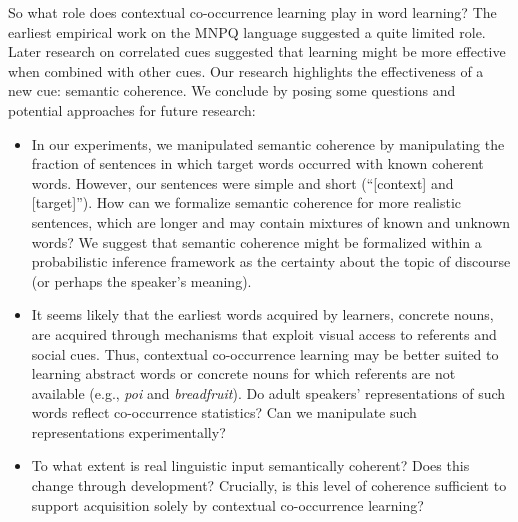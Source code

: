 \documentclass[man,floatsintext]{apa6}
\begin{document}



So what role does contextual co-occurrence learning play in word learning? The earliest empirical work on the MNPQ language suggested a quite limited role. Later research on correlated cues suggested that learning might be more effective when combined with other cues. Our research highlights the effectiveness of a new cue: semantic coherence. We conclude by posing some questions and potential approaches for future research:

\begin{itemize}
\item In our experiments, we manipulated semantic coherence by manipulating the fraction of sentences in which target words occurred with known coherent words. However, our sentences were simple and short (``[context] and [target]''). How can we formalize semantic coherence for more realistic sentences, which are longer and may contain mixtures of known and unknown words? We suggest that semantic coherence might be formalized within a probabilistic inference framework as the certainty about the topic of discourse (or perhaps the speaker's meaning).

\item It seems likely that the earliest words acquired by learners, concrete nouns, are acquired through mechanisms that exploit visual access to referents and social cues. Thus, contextual co-occurrence learning may be better suited to learning abstract words or concrete nouns for which referents are not available (e.g., \emph{poi} and \emph{breadfruit}). Do adult speakers' representations of such words reflect co-occurrence statistics? Can we manipulate such representations experimentally?

\item To what extent is real linguistic input semantically coherent? Does this change through development? Crucially, is this level of coherence sufficient to support acquisition solely by contextual co-occurrence learning?


\end{itemize}

\nocite{*}
\newpage


\end{document}
